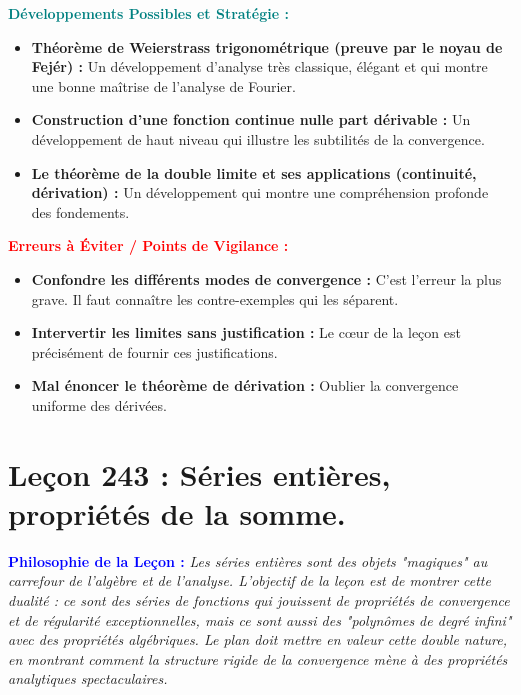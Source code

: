 \documentclass[12pt, a4paper, parskip=full]{report}
\theoremstyle{agregstyle}
\newenvironment{philosophie}
  {\par\medskip\noindent\begin{oframed}\noindent\textbf{\textcolor{blue}{Philosophie de la Leçon :}}\itshape}
  {\end{oframed}\par\medskip}
\newenvironment{developpements}
  {\par\medskip\noindent\begin{oframed}\noindent\textbf{\textcolor{teal}{Développements Possibles et Stratégie :}}}
  {\end{oframed}\par\medskip}
\newenvironment{erreurs}
  {\par\medskip\noindent\begin{oframed}\noindent\textbf{\textcolor{red}{Erreurs à Éviter / Points de Vigilance :}}}
  {\end{oframed}\par\medskip}
\begin{document}
\begin{developpements}
    \begin{itemize}
        \item \textbf{Théorème de Weierstrass trigonométrique (preuve par le noyau de Fejér) :} Un développement d'analyse très classique, élégant et qui montre une bonne maîtrise de l'analyse de Fourier.
        \item \textbf{Construction d'une fonction continue nulle part dérivable :} Un développement de haut niveau qui illustre les subtilités de la convergence.
        \item \textbf{Le théorème de la double limite et ses applications (continuité, dérivation) :} Un développement qui montre une compréhension profonde des fondements.
    \end{itemize}
\end{developpements}

\begin{erreurs}
    \begin{itemize}
        \item \textbf{Confondre les différents modes de convergence :} C'est l'erreur la plus grave. Il faut connaître les contre-exemples qui les séparent.
        \item \textbf{Intervertir les limites sans justification :} Le cœur de la leçon est précisément de fournir ces justifications.
        \item \textbf{Mal énoncer le théorème de dérivation :} Oublier la convergence uniforme des dérivées.
    \end{itemize}
\end{erreurs}
\chapter{Leçon 243 : Séries entières, propriétés de la somme.}

\begin{philosophie}
    Les séries entières sont des objets "magiques" au carrefour de l'algèbre et de l'analyse. L'objectif de la leçon est de montrer cette dualité : ce sont des séries de fonctions qui jouissent de propriétés de convergence et de régularité exceptionnelles, mais ce sont aussi des "polynômes de degré infini" avec des propriétés algébriques. Le plan doit mettre en valeur cette double nature, en montrant comment la structure rigide de la convergence mène à des propriétés analytiques spectaculaires.
\end{philosophie}
\end{document}

